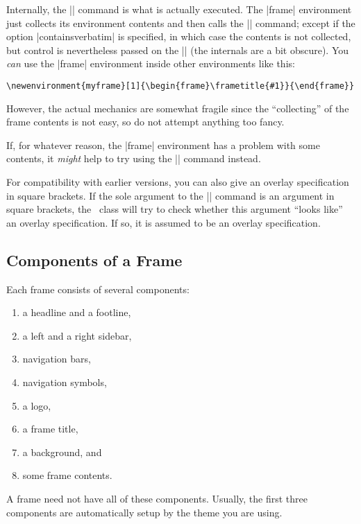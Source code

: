 Internally, the |\frame| command is what is actually executed. The
|frame| environment just collects its environment contents and then
calls the |\frame| command; except if the option |containsverbatim|
is specified, in which case the contents is not collected, but
control is nevertheless passed on the |\frame| (the internals are a
bit obscure). You \emph{can} use the |frame| environment inside other
environments like this:
\begin{verbatim}
\newenvironment{myframe}[1]{\begin{frame}\frametitle{#1}}{\end{frame}}
\end{verbatim}
However, the actual mechanics are somewhat fragile since the
``collecting'' of the frame contents is not easy, so
do not attempt anything too fancy.

If, for whatever reason, the |frame| environment has a problem with
some contents, it \emph{might} help to try using the |\frame|
command instead.

For compatibility with earlier versions, you can also give an overlay
specification in square brackets. If the sole argument to the |\frame|
command is an argument in square brackets, the \beamer\ class will try
to check whether this argument ``looks like'' an overlay
specification. If so, it is assumed to be an overlay specification.



\subsection{Components of a Frame}

Each frame consists of several components:
\begin{enumerate}\itemsep=0pt\parskip=0pt
\item a headline and a footline,
\item a left and a right sidebar,
\item navigation bars,
\item navigation symbols,
\item a logo,
\item a frame title, 
\item a background, and
\item some frame contents.
\end{enumerate}

A frame need not have all of these components. Usually, the first
three components are automatically setup by the theme you are using. 


